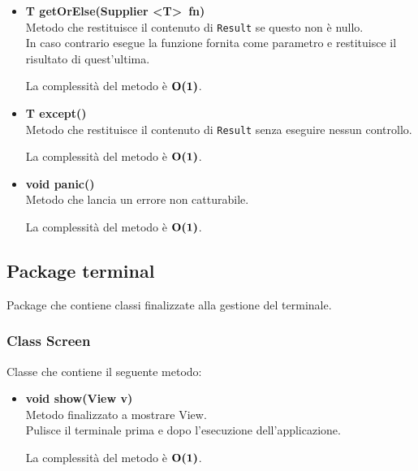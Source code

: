 \documentclass[a4paper, 12pt]{scrreprt}
\begin{document}
\begin{itemize}
					\item \textbf{T getOrElse(Supplier \textless T\textgreater~fn)}
					\\Metodo che restituisce il contenuto di \verb!Result! se questo non \`e nullo.
					\\In caso contrario esegue la funzione fornita come parametro e restituisce il risultato di quest'ultima.

					La complessit\`a del metodo \`e $\mathbf{O}\textbf{(1)}$.

					\item \textbf{T except()}
					\\Metodo che restituisce il contenuto di \verb!Result! senza eseguire nessun controllo.

					La complessit\`a del metodo \`e $\mathbf{O}\textbf{(1)}$.

					\item \textbf{void panic()}
					\\Metodo che lancia un errore non catturabile.

					La complessit\`a del metodo \`e $\mathbf{O}\textbf{(1)}$.

				\end{itemize}

			\subsection{Package terminal}
			Package che contiene classi finalizzate alla gestione del terminale.
				\subsubsection{Class Screen}
				Classe che contiene il seguente metodo:
				\begin{itemize}
					\item \textbf{void show(View v)}
					\\Metodo finalizzato a mostrare View.
					\\Pulisce il terminale prima e dopo l'esecuzione dell'applicazione.

					La complessit\`a del metodo \`e $\mathbf{O}\textbf{(1)}$.

				\end{itemize}
\end{document}
